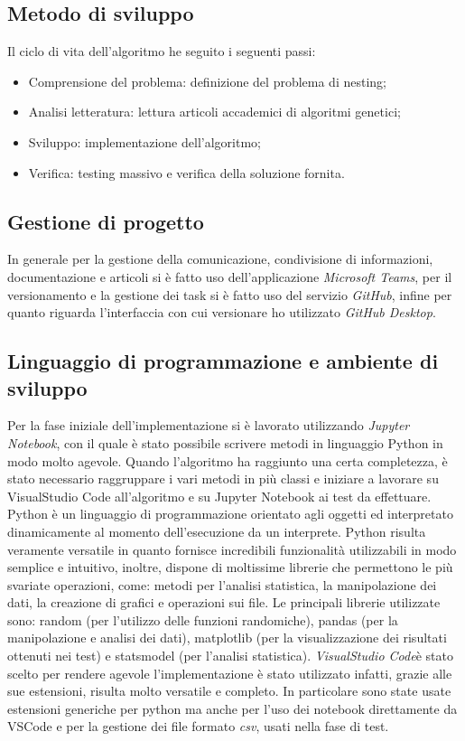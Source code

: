 \subsection{Metodo di sviluppo}
Il ciclo di vita dell'algoritmo he seguito i seguenti passi:
\begin{itemize}
    \item Comprensione del problema: definizione del problema di nesting;
    \item Analisi letteratura: lettura articoli accademici di algoritmi genetici;
    \item Sviluppo: implementazione dell'algoritmo;
    \item Verifica: testing massivo e verifica della soluzione fornita.
\end{itemize}

\subsection{Gestione di progetto}

In generale per la gestione della comunicazione, condivisione di informazioni, documentazione e articoli si è fatto uso dell’applicazione \emph{Microsoft Teams}\glsfirstoccur, per il versionamento e la gestione dei task si è fatto uso del servizio \emph{GitHub}\glsfirstoccur, infine per quanto riguarda l’interfaccia con cui versionare ho utilizzato \emph{GitHub Desktop}\glsfirstoccur.

\subsection{Linguaggio di programmazione e ambiente di sviluppo}

Per la fase iniziale dell'implementazione si è lavorato utilizzando \emph{Jupyter Notebook}\glsfirstoccur, con il quale è stato possibile scrivere metodi in linguaggio Python in modo molto agevole. Quando l'algoritmo ha raggiunto una certa completezza, è stato necessario raggruppare i vari metodi in più classi e iniziare a lavorare su VisualStudio Code all'algoritmo e su Jupyter Notebook ai test da effettuare.
Python è un linguaggio di programmazione orientato agli oggetti ed interpretato dinamicamente al momento dell’esecuzione da un interprete. Python risulta veramente versatile in quanto fornisce incredibili funzionalità utilizzabili in modo semplice e intuitivo, inoltre, dispone di moltissime librerie che permettono le più svariate operazioni, come: metodi per l'analisi statistica, la manipolazione dei dati, la creazione di grafici e operazioni sui file. 
Le principali librerie utilizzate sono: random (per l'utilizzo delle funzioni randomiche), pandas (per la manipolazione e analisi dei dati), matplotlib (per la visualizzazione dei risultati ottenuti nei test) e statsmodel (per l'analisi statistica).
\emph{VisualStudio Code}\glsfirstoccur è stato scelto per rendere agevole l'implementazione è stato utilizzato infatti, grazie alle sue estensioni, risulta molto versatile e completo. In particolare sono state usate estensioni generiche per python ma anche per l'uso dei notebook direttamente da VSCode e per la gestione dei file formato \emph{csv}\glsfirstoccur, usati nella fase di test.

